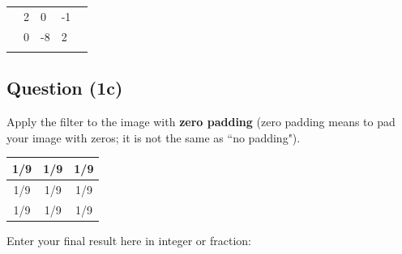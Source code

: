 \documentclass[12pt]{article}
\begin{document}
\begin{center}
\begin{tabular}{|l|l|l|l|l|}
\hline
\hspace{1mm} & \hspace{1mm} & \hspace{1mm} & \hspace{1mm} & \hspace{1mm} \\ \hline
\hspace{1mm} & 2 \hspace{1mm} & 0 \hspace{1mm} & -1 \hspace{1mm} & \hspace{1mm} \\ \hline
\hspace{1mm} & 0 \hspace{1mm} & -8 \hspace{1mm} & 2 \hspace{1mm} & \hspace{1mm} \\ \hline
\hspace{1mm} & \hspace{1mm} & \hspace{1mm} & \hspace{1mm} & \hspace{1mm} \\ \hline
\end{tabular}
\end{center}

\newpage

\subsection*{Question (1c)} Apply the filter to the image with \textbf{zero padding} (zero padding means to pad your image with zeros; it is not the same as ``no padding").
\begin{center}
\begin{tabular}{|c|c|c|}
\hline
1/9  & 1/9 & 1/9 \\ \hline
1/9  & 1/9 & 1/9 \\ \hline
1/9  & 1/9 & 1/9 \\ \hline
\end{tabular}
\end{center}

\noindent Enter your final result here in integer or fraction:
\end{document}

